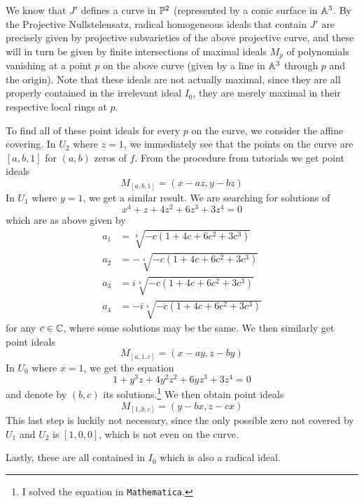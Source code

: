 \documentclass[a4paper, 12pt]{article}
\begin{document}
\begin{Exercise}
\begin{enumerate}[label=(\roman*)]
            We know that $J'$ defines a curve in $\P^2$ (represented by a conic surface in $\A^3$.
            By the Projective Nullstelensatz, radical homogeneous ideals that contain $J'$
            are precisely given by projective subvarieties of the above projective curve,
            and these will in turn be given by finite intersections of maximal ideals $M_p$
            of polynomials vanishing at a point $p$ on the above curve (given by a line in $\A^3$ through $p$ and the origin).
            Note that these ideals are not actually maximal, since they are all properly contained in the irrelevant ideal $I_0$,
            they are merely maximal in their respective local rings at $p$.

            To find all of these point ideals for every $p$ on the curve, we consider the affine covering.
            In $U_2$ where $z = 1$, we immediately see that the points on the curve are $[a, b, 1]$ for $(a, b)$ zeros of $f$.
            From the procedure from tutorials we get point ideals
            \[
                M_{[a, b, 1]} = (x - az, y - bz)
            \]
            In $U_1$ where $y = 1$, we get a similar result.
            We are searching for solutions of
            \[
                x^4 + z + 4z^2 + 6z^3 + 3z^4 = 0
            \]
            which are as above given by
            \begin{align*}
                a_1 &= \sqrt[4]{-c(1 + 4c + 6c^2 + 3c^3)} \\
                a_2 &= -\sqrt[4]{-c(1 + 4c + 6c^2 + 3c^3)} \\
                a_3 &= i\sqrt[4]{-c(1 + 4c + 6c^2 + 3c^3)} \\
                a_4 &= -i\sqrt[4]{-c(1 + 4c + 6c^2 + 3c^3)}
            \end{align*}
            for any $c \in \C$, where some solutions may be the same.
            We then similarly get point ideals
            \[
                M_{[a,1,c]} = (x - ay, z - by)
            \]
            In $U_0$ where $x = 1$, we get the equation
            \[
                1 + y^3z + 4y^2z^2 + 6yz^3 + 3z^4 = 0
            \]
            and denote by $(b, c)$ its solutions.\footnote{I solved the equation in \texttt{Mathematica}.}
            We then obtain point ideals
            \[
                M_{[1, b, c]} = (y - bx, z - cx)
            \]
            This last step is luckily not necessary,
            since the only possible zero not covered by $U_1$ and $U_2$ is $[1, 0, 0]$,
            which is not even on the curve.

            Lastly, these are all contained in $I_0$ which is also a radical ideal.
    \end{enumerate}
\end{Exercise}
\end{document}
